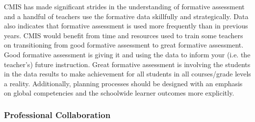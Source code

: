 \begin{findings}

CMIS has made significant strides in the understanding of formative assessment and a handful of teachers use the formative data skillfully and strategically. Data also indicates that formative assessment is used more frequently than in previous years. CMIS would benefit from time and resources used to train some teachers on transitioning from good formative assessment to great formative assessment. Good formative assessment is giving it and using the data to inform your (i.e. the teacher’s) future instruction. Great formative assessment is involving the students in the data results to make achievement for all students in all courses/grade levels a reality. Additionally, planning processes should be designed with an emphasis on global competencies and the schoolwide learner outcomes more explicitly. 
\end{findings}

\subsubsection{Professional Collaboration}



